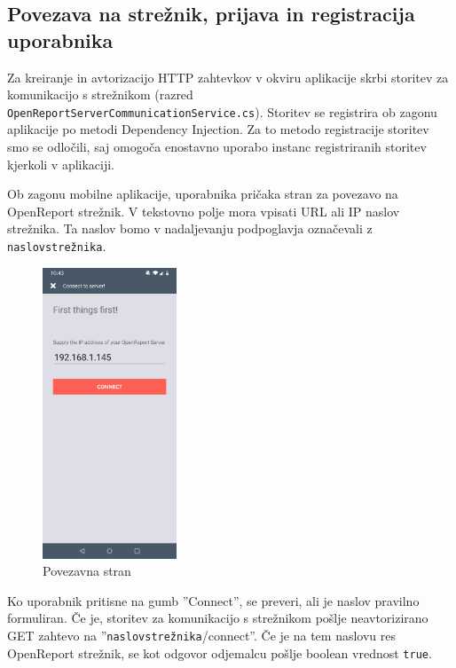 \documentclass[a4paper, 12pt]{book}
\begin{document}
\subsection{Povezava na strežnik, prijava in registracija uporabnika}

Za kreiranje in avtorizacijo HTTP zahtevkov v okviru aplikacije skrbi storitev za komunikacijo s strežnikom (razred \\\texttt{OpenReportServerCommunicationService.cs}).
Storitev se registrira ob zagonu aplikacije po metodi Dependency Injection.
Za to metodo registracije storitev smo se odločili, saj omogoča enostavno uporabo instanc registriranih storitev kjerkoli v aplikaciji.

Ob zagonu mobilne aplikacije, uporabnika pričaka stran za povezavo na OpenReport strežnik.
V tekstovno polje mora vpisati URL ali IP naslov strežnika.
Ta naslov bomo v nadaljevanju podpoglavja označevali z \texttt{naslovstrežnika}.


\begin{figure}[H]
\begin{center}
\includegraphics[width=4cm]{app_connect}
\end{center}
\caption{Povezavna stran}
\label{app_connect}
\end{figure}

Ko uporabnik pritisne na gumb ''Connect'', se preveri, ali je naslov pravilno formuliran.
Če je, storitev za komunikacijo s strežnikom pošlje neavtorizirano GET zahtevo na ''\texttt{naslovstrežnika}/connect''. 
Če je na tem naslovu res OpenReport strežnik, se kot odgovor odjemalcu pošlje boolean vrednost \texttt{true}.
\end{document}
